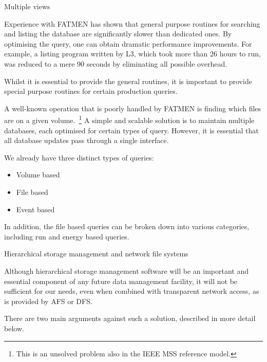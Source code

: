 \begin{slide}
\begin{center}Multiple views\end{center}

Experience with FATMEN has shown that general purpose
routines for searching and listing the database are significantly
slower than dedicated ones. By optimising the query, one can
obtain dramatic performance improvements. For example, a listing
program written by L3, which took more than 26 hours to run, 
was reduced to a mere 90 seconds by eliminating all possible overhead.

Whilst it is essential to provide the general routines, it is 
important to provide special purpose routines for certain production
queries.

A well-known operation that is poorly handled by FATMEN is finding
which files are on a given volume.~\footnote{This is an unsolved
problem also in the IEEE MSS reference model.} A simple and scalable
solution is to maintain multiple databases, each optimised for 
certain types of query. However, it is essential that all database
updates pass through a single interface.

\end{slide}

\begin{slide}
We already have three distinct types of queries:

\begin{itemize}
\item
Volume based
\item
File based
\item
Event based
\end{itemize}

In addition, the file based queries can be broken down into
various categories, including run and  energy based queries.

\end{slide}

\begin{slide}
\begin{center}Hierarchical storage management and network file systems\end{center}

Although hierarchical storage management software will be an
important and essential component of any future data management
facility, it will not be sufficient for our needs, even
when combined with transparent network access, as is provided
by AFS or DFS.

There are two main arguments against such a solution, described
in more detail below.
\end{slide}

